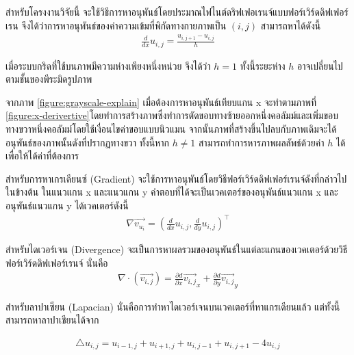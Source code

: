 \hspace{1cm} สำหรับโครงงานวิจัยนี้ จะใช้วิธีการหาอนุพันธ์โดยประมาณไฟไนต์ดริฟเฟอเรนจ์แบบฟอร์เวิร์ดดิฟเฟอร์เรน จึงได้ว่าการหาอนุพันธ์ของค่าความเข้มที่พิกัดทางกายภาพเป็น $(i,j)$ สามารถหาได้ดังนี้
\begin{align*}
	\frac{d}{dx} u_{i,j} = \frac{u_{i,j+1} - u_{i,j}}{h}
\end{align*}

เมื่อระบบกริดที่ใช้บนภาพมีความห่างเพียงหนึ่งหน่วย จึงได้ว่า $h=1$ ทั้งนี้ระยะห่าง $h$ อาจเปลี่ยนไปตามชั้นของพีระมิดรูปภาพ



\hspace{1cm} จากภาพ \ref{figure:grayscale-explain} เมื่อต้องการหาอนุพันธ์เทียบแกน x จะทำตามภาพที่ \ref{figure:x-derivertive}โดยทำการสร้างภาพซึ่งทำการตัดขอบทางซ้ายออกหนึ่งคอลัมม์และเพิ่มขอบทางขวาหนึ่งคอลัมม์โดยใช้เงื่อนไขค่าขอบแบบนิวแมน จากนั้นภาพที่สร้างขึ้นไปลบกับภาพเดิมจะได้อนุพันธ์ของภาพนั้นดังที่ปรากฏทางขวา ทั้งนี้หาก $ h \neq 1 $ สามารถทำการหารภาพผลลัพธ์ด้วยค่า $h$ ได้เพื่อให้ได้ค่าที่ต้องการ

\noindent\hspace{1cm}สำหรับการหาเกรเดียนซ์ (Gradient) จะใช้การหาอนุพันธ์โดยวิธีฟอร์เวิร์ดดิฟเฟอร์เรนจ์ดังที่กล่าวไปในข้างต้น ในแนวแกน x และแนวแกน y คำตอบที่ได้จะเป็นเวคเตอร์ของอนุพันธ์แนวแกน x และอนุพันธ์แนวแกน y  ได้เวคเตอร์ดังนี้ 
\begin{align*}
	\nabla \vec{v_{u_i}} = (\frac{d}{dx} u_{i,j},\frac{d}{dy} u_{i,j})^{\top}	
\end{align*}

\noindent\hspace{1cm}สำหรับไดเวอร์เจน (Divergence) จะเป็นการหาผลรวมของอนุพันธ์ในแต่ละแกนของเวคเตอร์ด้วยวิธีฟอร์เวิร์ดดิฟเฟอร์เรนจ์ นั่นคือ 
\begin{align*} 
	\nabla \cdot (\vec{v_{i,j}}) = \frac{\partial d}{\partial x}\vec{v_{i,j}}_x + \frac{\partial d}{\partial y}\vec{v_{i,j}}_y
\end{align*}

\noindent\hspace{1cm}สำหรับลาปาเซียน (Lapacian) นั่นคือการทำหาไดเวอร์เจนบนเวคเตอร์ที่หาแกรเดียนแล้ว แต่ทั้งนี้สามารถหาลาปาเชียนได้จาก

\begin{align*}
	\triangle u_{i,j} = u_{i-1,j} + u_{i+1,j} + u_{i,j-1} + u_{i,j+1} - 4 u_{i,j} 
\end{align*}



